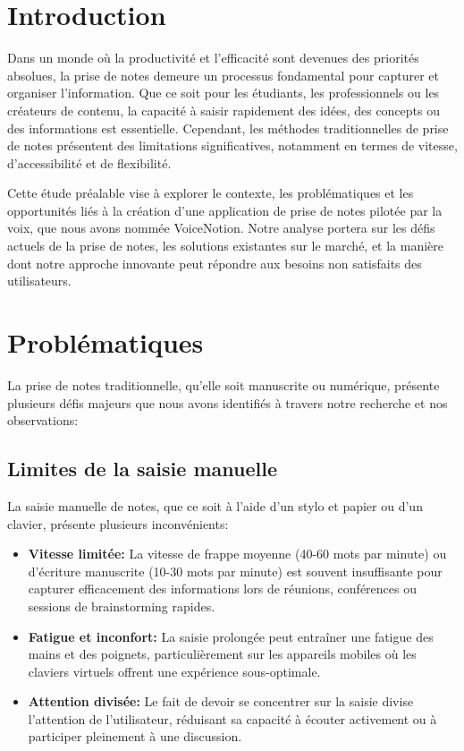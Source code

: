 


\section{Introduction}

Dans un monde où la productivité et l'efficacité sont devenues des priorités absolues, la prise de notes demeure un processus fondamental pour capturer et organiser l'information. Que ce soit pour les étudiants, les professionnels ou les créateurs de contenu, la capacité à saisir rapidement des idées, des concepts ou des informations est essentielle. Cependant, les méthodes traditionnelles de prise de notes présentent des limitations significatives, notamment en termes de vitesse, d'accessibilité et de flexibilité.

Cette étude préalable vise à explorer le contexte, les problématiques et les opportunités liés à la création d'une application de prise de notes pilotée par la voix, que nous avons nommée VoiceNotion. Notre analyse portera sur les défis actuels de la prise de notes, les solutions existantes sur le marché, et la manière dont notre approche innovante peut répondre aux besoins non satisfaits des utilisateurs.

\section{Problématiques}

La prise de notes traditionnelle, qu'elle soit manuscrite ou numérique, présente plusieurs défis majeurs que nous avons identifiés à travers notre recherche et nos observations:

\subsection{Limites de la saisie manuelle}

La saisie manuelle de notes, que ce soit à l'aide d'un stylo et papier ou d'un clavier, présente plusieurs inconvénients:

\begin{itemize}
    \item \textbf{Vitesse limitée:} La vitesse de frappe moyenne (40-60 mots par minute) ou d'écriture manuscrite (10-30 mots par minute) est souvent insuffisante pour capturer efficacement des informations lors de réunions, conférences ou sessions de brainstorming rapides.
    
    \item \textbf{Fatigue et inconfort:} La saisie prolongée peut entraîner une fatigue des mains et des poignets, particulièrement sur les appareils mobiles où les claviers virtuels offrent une expérience sous-optimale.
    
    \item \textbf{Attention divisée:} Le fait de devoir se concentrer sur la saisie divise l'attention de l'utilisateur, réduisant sa capacité à écouter activement ou à participer pleinement à une discussion.
\end{itemize}

